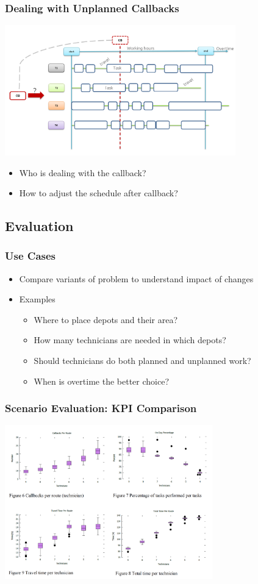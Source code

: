 \begin{frame}
\frametitle{Dealing with Unplanned Callbacks}
\includegraphics[width=10cm]{imagesfieldservice/callbacks}
\begin{itemize}
\item Who is dealing with the callback?
\item How to adjust the schedule after callback?
\end{itemize}
\end{frame}

\subsection{Evaluation}

\begin{frame}
\frametitle{Use Cases}
\begin{itemize}
\item Compare variants of problem to understand impact of changes
\item Examples
\begin{itemize}
\item Where to place depots and their area? 
\item How many technicians are needed in which depots?
\item Should technicians do both planned and unplanned work?
\item When is overtime the better choice?
\end{itemize}
\end{itemize}
\end{frame}

\begin{frame}
\frametitle{Scenario Evaluation: KPI Comparison}
\includegraphics[width=9cm]{imagesfieldservice/scenarioevaluation}
\end{frame}

